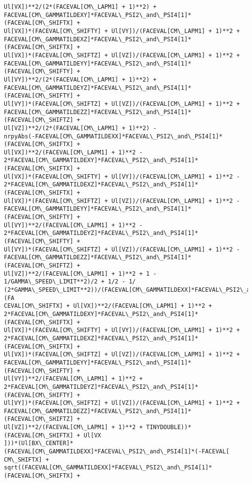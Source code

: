 \documentclass[landscape,letterpaper,10pt,english]{article}
\begin{document}
\begin{Verbatim}[commandchars=\\\{\}]
Ul[VX])**2/(2*(FACEVAL[CM\_LAPM1] + 1)**2) +
FACEVAL[CM\_GAMMATILDEXY]*FACEVAL\_PSI2\_and\_PSI4[1]*(FACEVAL[CM\_SHIFTX] +
Ul[VX])*(FACEVAL[CM\_SHIFTY] + Ul[VY])/(FACEVAL[CM\_LAPM1] + 1)**2 +
FACEVAL[CM\_GAMMATILDEXZ]*FACEVAL\_PSI2\_and\_PSI4[1]*(FACEVAL[CM\_SHIFTX] +
Ul[VX])*(FACEVAL[CM\_SHIFTZ] + Ul[VZ])/(FACEVAL[CM\_LAPM1] + 1)**2 +
FACEVAL[CM\_GAMMATILDEYY]*FACEVAL\_PSI2\_and\_PSI4[1]*(FACEVAL[CM\_SHIFTY] +
Ul[VY])**2/(2*(FACEVAL[CM\_LAPM1] + 1)**2) +
FACEVAL[CM\_GAMMATILDEYZ]*FACEVAL\_PSI2\_and\_PSI4[1]*(FACEVAL[CM\_SHIFTY] +
Ul[VY])*(FACEVAL[CM\_SHIFTZ] + Ul[VZ])/(FACEVAL[CM\_LAPM1] + 1)**2 +
FACEVAL[CM\_GAMMATILDEZZ]*FACEVAL\_PSI2\_and\_PSI4[1]*(FACEVAL[CM\_SHIFTZ] +
Ul[VZ])**2/(2*(FACEVAL[CM\_LAPM1] + 1)**2) -
nrpyAbs(-FACEVAL[CM\_GAMMATILDEXX]*FACEVAL\_PSI2\_and\_PSI4[1]*(FACEVAL[CM\_SHIFTX] +
Ul[VX])**2/(FACEVAL[CM\_LAPM1] + 1)**2 -
2*FACEVAL[CM\_GAMMATILDEXY]*FACEVAL\_PSI2\_and\_PSI4[1]*(FACEVAL[CM\_SHIFTX] +
Ul[VX])*(FACEVAL[CM\_SHIFTY] + Ul[VY])/(FACEVAL[CM\_LAPM1] + 1)**2 -
2*FACEVAL[CM\_GAMMATILDEXZ]*FACEVAL\_PSI2\_and\_PSI4[1]*(FACEVAL[CM\_SHIFTX] +
Ul[VX])*(FACEVAL[CM\_SHIFTZ] + Ul[VZ])/(FACEVAL[CM\_LAPM1] + 1)**2 -
FACEVAL[CM\_GAMMATILDEYY]*FACEVAL\_PSI2\_and\_PSI4[1]*(FACEVAL[CM\_SHIFTY] +
Ul[VY])**2/(FACEVAL[CM\_LAPM1] + 1)**2 -
2*FACEVAL[CM\_GAMMATILDEYZ]*FACEVAL\_PSI2\_and\_PSI4[1]*(FACEVAL[CM\_SHIFTY] +
Ul[VY])*(FACEVAL[CM\_SHIFTZ] + Ul[VZ])/(FACEVAL[CM\_LAPM1] + 1)**2 -
FACEVAL[CM\_GAMMATILDEZZ]*FACEVAL\_PSI2\_and\_PSI4[1]*(FACEVAL[CM\_SHIFTZ] +
Ul[VZ])**2/(FACEVAL[CM\_LAPM1] + 1)**2 + 1 - 1/GAMMA\_SPEED\_LIMIT**2)/2 + 1/2 - 1/
(2*GAMMA\_SPEED\_LIMIT**2))/(FACEVAL[CM\_GAMMATILDEXX]*FACEVAL\_PSI2\_and\_PSI4[1]*(FA
CEVAL[CM\_SHIFTX] + Ul[VX])**2/(FACEVAL[CM\_LAPM1] + 1)**2 +
2*FACEVAL[CM\_GAMMATILDEXY]*FACEVAL\_PSI2\_and\_PSI4[1]*(FACEVAL[CM\_SHIFTX] +
Ul[VX])*(FACEVAL[CM\_SHIFTY] + Ul[VY])/(FACEVAL[CM\_LAPM1] + 1)**2 +
2*FACEVAL[CM\_GAMMATILDEXZ]*FACEVAL\_PSI2\_and\_PSI4[1]*(FACEVAL[CM\_SHIFTX] +
Ul[VX])*(FACEVAL[CM\_SHIFTZ] + Ul[VZ])/(FACEVAL[CM\_LAPM1] + 1)**2 +
FACEVAL[CM\_GAMMATILDEYY]*FACEVAL\_PSI2\_and\_PSI4[1]*(FACEVAL[CM\_SHIFTY] +
Ul[VY])**2/(FACEVAL[CM\_LAPM1] + 1)**2 +
2*FACEVAL[CM\_GAMMATILDEYZ]*FACEVAL\_PSI2\_and\_PSI4[1]*(FACEVAL[CM\_SHIFTY] +
Ul[VY])*(FACEVAL[CM\_SHIFTZ] + Ul[VZ])/(FACEVAL[CM\_LAPM1] + 1)**2 +
FACEVAL[CM\_GAMMATILDEZZ]*FACEVAL\_PSI2\_and\_PSI4[1]*(FACEVAL[CM\_SHIFTZ] +
Ul[VZ])**2/(FACEVAL[CM\_LAPM1] + 1)**2 + TINYDOUBLE))*(FACEVAL[CM\_SHIFTX] + Ul[VX
]))*(Ul[BX\_CENTER]*(FACEVAL[CM\_GAMMATILDEXX]*FACEVAL\_PSI2\_and\_PSI4[1]*(-FACEVAL[
CM\_SHIFTX] +
sqrt((FACEVAL[CM\_GAMMATILDEXX]*FACEVAL\_PSI2\_and\_PSI4[1]*(FACEVAL[CM\_SHIFTX] +

\end{Verbatim}
\end{document}
